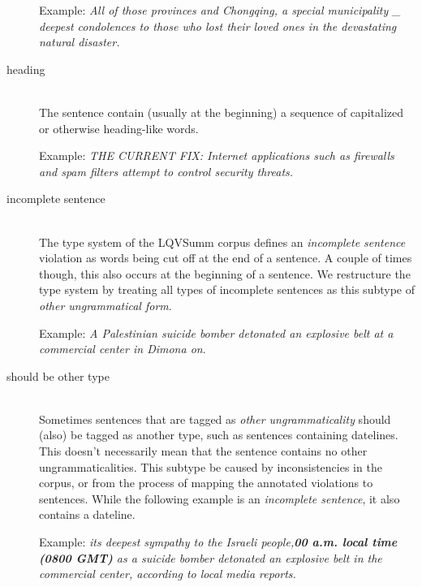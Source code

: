 \documentclass[a4paper,10pt]{scrartcl}
\theoremstyle{style}
\begin{document}
\begin{description}
	Example: \textit{All of those provinces and Chongqing, a special municipality \_ deepest condolences to those who lost their loved ones in the devastating natural disaster.}

\item[heading] \hfill \\
	The sentence contain (usually at the beginning) a sequence of capitalized or otherwise heading-like words. %

	Example: \textit{THE CURRENT FIX: Internet applications such as firewalls and spam filters attempt to control security threats.}

\item[incomplete sentence] \hfill \\
	The type system of the LQVSumm corpus \citep{valeeva} defines an \textit{incomplete sentence} violation as words being cut off at the end of a sentence. A couple of times though, this also occurs at the beginning of a sentence. We restructure the type system by treating all types of incomplete sentences as this subtype of \textit{other ungrammatical form}.

	Example: \textit{A Palestinian suicide bomber detonated an explosive belt at a \\commercial center in Dimona on}.
\item[should be other type] \hfill \\
	Sometimes sentences that are tagged as \textit{other ungrammaticality} should (also) be tagged as another type, such as sentences containing datelines. This doesn't necessarily mean that the sentence contains no other ungrammaticalities. This subtype be caused by inconsistencies in the corpus, or from the process of mapping the annotated violations to sentences. While the following example is an \textit{incomplete sentence}, it also contains a dateline.

	Example: \textit{its deepest sympathy to the Israeli people,\textbf{00 a.m. local time (0800 GMT)} as a suicide bomber detonated an explosive belt in the commercial center, according to local media reports.}
%


\end{description}
\end{document}
